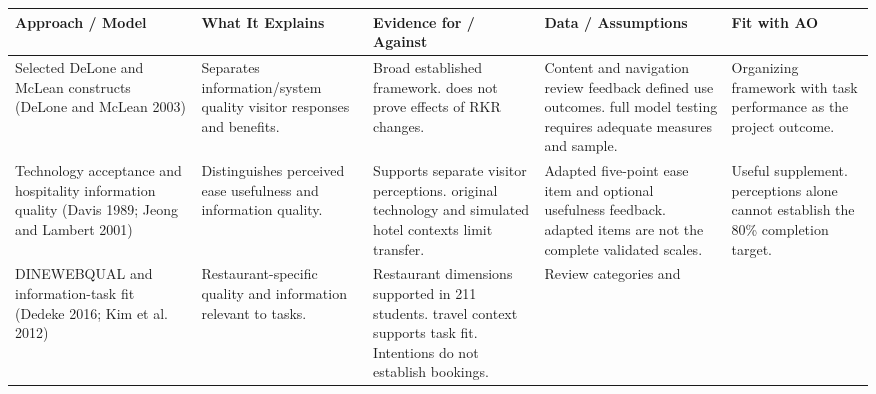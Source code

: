\documentclass[
  12pt,
  letterpaper,
  DIV=11,
  numbers=noendperiod]{scrartcl}
\begin{document}
\begin{longtable}[]{@{}
  >{\raggedright\arraybackslash}p{}
  >{\raggedright\arraybackslash}p{}
  >{\raggedright\arraybackslash}p{}
  >{\raggedright\arraybackslash}p{}
  >{\raggedright\arraybackslash}p{}@{}}
\toprule\noalign{}
\begin{minipage}[b]{\linewidth}\raggedright
Approach / Model
\end{minipage} & \begin{minipage}[b]{\linewidth}\raggedright
What It Explains
\end{minipage} & \begin{minipage}[b]{\linewidth}\raggedright
Evidence for / Against
\end{minipage} & \begin{minipage}[b]{\linewidth}\raggedright
Data / Assumptions
\end{minipage} & \begin{minipage}[b]{\linewidth}\raggedright
Fit with AO
\end{minipage} \\
\midrule\noalign{}
\endhead
\bottomrule\noalign{}
\endlastfoot
Selected DeLone and McLean constructs (DeLone and McLean 2003) &
Separates information/system quality visitor responses and benefits. &
Broad established framework. does not prove effects of RKR changes. &
Content and navigation review feedback defined use outcomes. full model
testing requires adequate measures and sample. & Organizing framework
with task performance as the project outcome. \\
Technology acceptance and hospitality information quality (Davis 1989;
Jeong and Lambert 2001) & Distinguishes perceived ease usefulness and
information quality. & Supports separate visitor perceptions. original
technology and simulated hotel contexts limit transfer. & Adapted
five-point ease item and optional usefulness feedback. adapted items are
not the complete validated scales. & Useful supplement. perceptions
alone cannot establish the 80\% completion target. \\
DINEWEBQUAL and information-task fit (Dedeke 2016; Kim et al. 2012) &
Restaurant-specific quality and information relevant to tasks. &
Restaurant dimensions supported in 211 students. travel context supports
task fit. Intentions do not establish bookings. & Review categories and

\end{longtable}
\end{document}
